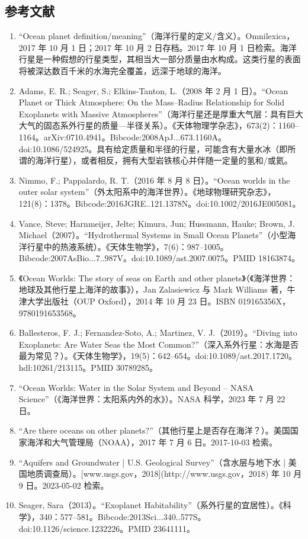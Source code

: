 \subsection{参考文献}
\begin{enumerate}
\item “Ocean planet definition/meaning”（海洋行星的定义/含义）。Omnilexica，2017 年 10 月 1 日；2017 年 10 月 2 日存档。2017 年 10 月 1 日检索。海洋行星是一种假想的行星类型，其相当大一部分质量由水构成。这类行星的表面将被深达数百千米的水海完全覆盖，远深于地球的海洋。
\item Adams, E. R.; Seager, S.; Elkins-Tanton, L.（2008 年 2 月 1 日）。“Ocean Planet or Thick Atmosphere: On the Mass–Radius Relationship for Solid Exoplanets with Massive Atmospheres”（海洋行星还是厚重大气层：具有巨大大气的固态系外行星的质量—半径关系）。《天体物理学杂志》，673(2)：1160–1164。arXiv:0710.4941。Bibcode:2008ApJ...673.1160A。doi:10.1086/524925。具有给定质量和半径的行星，可能含有大量水冰（即所谓的海洋行星），或者相反，拥有大型岩铁核心并伴随一定量的氢和/或氦。
\item Nimmo, F.; Pappalardo, R. T.（2016 年 8 月 8 日）。“Ocean worlds in the outer solar system”（外太阳系中的海洋世界）。《地球物理研究杂志》，121(8)：1378。Bibcode:2016JGRE..121.1378N。doi:10.1002/2016JE005081。
\item Vance, Steve; Harnmeijer, Jelte; Kimura, Jun; Hussmann, Hauke; Brown, J. Michael（2007）。“Hydrothermal Systems in Small Ocean Planets”（小型海洋行星中的热液系统）。《天体生物学》，7(6)：987–1005。Bibcode:2007AsBio...7..987V。doi:10.1089/ast.2007.0075。PMID 18163874。
\item 《Ocean Worlds: The story of seas on Earth and other planets》（《海洋世界：地球及其他行星上海洋的故事》），Jan Zalasiewicz 与 Mark Williams 著，牛津大学出版社（OUP Oxford），2014 年 10 月 23 日。ISBN 019165356X，9780191653568。
\item Ballesteros, F. J.; Fernandez-Soto, A.; Martinez, V. J.（2019）。“Diving into Exoplanets: Are Water Seas the Most Common?”（深入系外行星：水海是否最为常见？）。《天体生物学》，19(5)：642–654。doi:10.1089/ast.2017.1720。hdl:10261/213115。PMID 30789285。
\item “Ocean Worlds: Water in the Solar System and Beyond – NASA Science”（《海洋世界：太阳系内外的水》）。NASA 科学，2023 年 7 月 22 日。
\item “Are there oceans on other planets?”（其他行星上是否存在海洋？）。美国国家海洋和大气管理局（NOAA），2017 年 7 月 6 日。2017-10-03 检索。
\item “Aquifers and Groundwater | U.S. Geological Survey”（含水层与地下水 | 美国地质调查局）。[www.usgs.gov，2018](http://www.usgs.gov，2018) 年 10 月 9 日。2023-05-02 检索。
\item Seager, Sara（2013）。“Exoplanet Habitability”（系外行星的宜居性）。《科学》，340：577–581。Bibcode:2013Sci...340..577S。doi:10.1126/science.1232226。PMID 23641111。


\end{enumerate}
